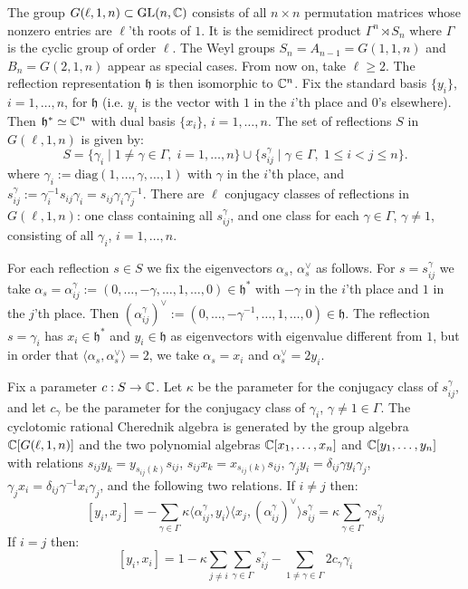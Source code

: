 \documentclass[12pt]{amsart}
\numberwithin{equation}{section}
\theoremstyle{definition}
\newcommand{\hstar}{\mathfrak{h}^*}
\begin{document}
The group $G(\ell,1,n)\subset\mathrm{GL}(n,\mathbb{C})$ consists of all $n\times n$ permutation matrices whose nonzero entries are $\ell$'th roots of $1$. It is the semidirect product $\Gamma^n\rtimes S_n$ where $\Gamma$ is the cyclic group of order $\ell$. The Weyl groups $S_n=A_{n-1}=G(1,1,n)$ and $B_n=G(2,1,n)$ appear as special cases. From now on, take $\ell\geq 2$. The reflection representation $\mathfrak{h}$ is then isomorphic to $\mathbb{C}^n$. Fix the standard basis $\{y_i\}$, $i=1,\dots,n$, for $\mathfrak{h}$ (i.e. $y_i$ is the vector with $1$ in the $i$'th place and $0$'s elsewhere). Then $\mathfrak{h}^*\simeq\mathbb{C}^n$ with dual basis $\{x_i\}$, $i=1,\dots,n$.  The set of reflections $S$ in $G(\ell,1,n)$ is given by:
$$S=\{\gamma_i\mid 1\neq\gamma\in\Gamma,\;i=1,\dots, n\}\cup
\{s_{ij}^\gamma\mid \gamma\in\Gamma,\; 1\leq i<j\leq n\}.$$
where $\gamma_i:=\mathrm{diag}(1,\dots,\gamma,\dots,1)$ with $\gamma$ in the $i$'th place, and $s_{ij}^\gamma:=\gamma_i^{-1}s_{ij}\gamma_i=s_{ij}\gamma_i\gamma_j^{-1}$.
There are $\ell$ conjugacy classes of reflections in $G(\ell,1,n)$: one class containing all $s_{ij}^\gamma$, and one class for each $\gamma\in\Gamma$, $\gamma\neq 1$, consisting of all $\gamma_i$, $i=1,\dots,n$. 

For each reflection $s\in S$ we fix the eigenvectors $\alpha_s$, $\alpha_s^\vee$ as follows. For $s=s_{ij}^\gamma$ we take $\alpha_s=\alpha_{ij}^\gamma:=(0,\dots,-\gamma,\dots,1,\dots,0)\in\hstar$ with $-\gamma$ in the $i$'th place and $1$ in the $j$'th place. Then 
$(\alpha_{ij}^\gamma)^\vee:=(0,\dots,-\gamma^{-1},\dots,1,\dots,0)\in\mathfrak{h}$. 
The reflection $s=\gamma_i$ has $x_i\in\hstar$ and $y_i\in\mathfrak{h}$ as eigenvectors with eigenvalue different from $1$, but in order that $\langle\alpha_s,\alpha_s^\vee\rangle=2$, we take $\alpha_s=x_i$ and $\alpha_s^\vee=2y_i$.

Fix a parameter $c:S\rightarrow\mathbb{C}$. Let $\kappa$ be the parameter for the conjugacy class of $s_{ij}^\gamma$, and let $c_\gamma$ be the parameter for the conjugacy class of $\gamma_i$, $\gamma\neq 1\in\Gamma$. The cyclotomic rational Cherednik algebra is generated by the group algebra $\mathbb{C}[G(\ell,1,n)]$ and the two polynomial algebras $\mathbb{C}[x_1,\dots,x_n]$ and $\mathbb{C}[y_1,\dots,y_n]$ with relations $s_{ij}y_k=y_{s_{ij}(k)}s_{ij}$, $s_{ij}x_k=x_{s_{ij}(k)}s_{ij}$, $\gamma_j y_i=\delta_{ij}\gamma y_i\gamma_j$, $\gamma_j x_i=\delta_{ij}\gamma^{-1} x_i\gamma_j$, and the following two relations.
If $i\neq j$ then:
$$[y_i,x_j]=-\sum_{\gamma\in\Gamma}\kappa \langle \alpha_{ij}^\gamma,y_i\rangle \langle x_j,(\alpha_{ij}^\gamma)^\vee\rangle s_{ij}^\gamma=\kappa\sum_{\gamma\in\Gamma}\gamma s_{ij}^\gamma$$
If $i=j$ then:
$$
[y_i,x_i]=1-\kappa\sum_{j\neq i}\sum_{\gamma\in\Gamma}s_{ij}^\gamma -\sum_{1\neq\gamma\in\Gamma}2c_\gamma\gamma_i
$$
\end{document}
